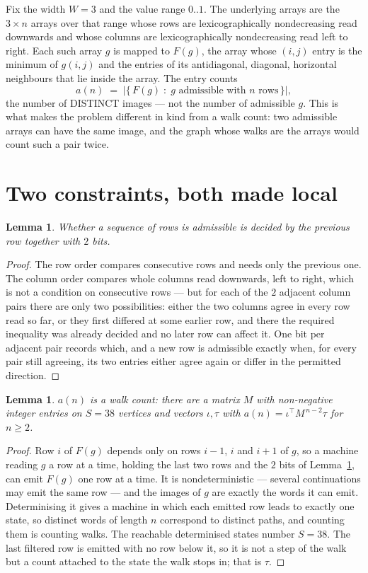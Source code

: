 \documentclass[11pt,a4paper]{article}
\theoremstyle{plain}
\newtheorem{lemma}[theorem]{Lemma}
\theoremstyle{definition}
\begin{document}
Fix the width $W=3$ and the value range $0..1$. The underlying arrays are the
$3\times n$ arrays over that range whose rows are lexicographically nondecreasing read downwards
and whose columns are lexicographically nondecreasing read left to right. Each such array $g$
is mapped to $F(g)$, the array whose $(i,j)$ entry is the minimum of $g(i,j)$ and the entries
of its antidiagonal, diagonal, horizontal neighbours that lie inside the array. The entry counts
\[
a(n)\;=\;\bigl|\{\,F(g)\;:\;g\text{ admissible with }n\text{ rows}\,\}\bigr|,
\]
the number of DISTINCT images --- not the number of admissible $g$. This is what makes the
problem different in kind from a walk count: two admissible arrays can have the same image, and
the graph whose walks are the arrays would count such a pair twice.

\section{Two constraints, both made local}

\begin{lemma}\label{lem:local}
Whether a sequence of rows is admissible is decided by the previous row together with
$2$ bits.
\end{lemma}

\begin{proof}
The row order compares consecutive rows and needs only the previous one. The column order
compares whole columns read downwards, left to right, which is not a condition on consecutive
rows --- but for each of the $2$ adjacent column pairs there are only two possibilities:
either the two columns agree in every row read so far, or they first differed at some earlier
row, and there the required inequality was already decided and no later row can affect it. One
bit per adjacent pair records which, and a new row is admissible exactly when, for every pair
still agreeing, its two entries either agree again or differ in the permitted direction.
\end{proof}

\begin{lemma}\label{lem:det}
$a(n)$ is a walk count: there are a matrix $M$ with non-negative integer entries on $S=38$
vertices and vectors $\iota,\tau$ with $a(n)=\iota^{\!\top}M^{\,n-2}\tau$ for $n\ge2$.
\end{lemma}

\begin{proof}
Row $i$ of $F(g)$ depends only on rows $i-1$, $i$ and $i+1$ of $g$, so a machine reading $g$ a
row at a time, holding the last two rows and the $2$ bits of Lemma~\ref{lem:local}, can
emit $F(g)$ one row at a time. It is nondeterministic --- several continuations may emit the
same row --- and the images of $g$ are exactly the words it can emit. Determinising it gives a
machine in which each emitted row leads to exactly one state, so distinct words of length $n$
correspond to distinct paths, and counting them is counting walks. The reachable determinised
states number $S=38$. The last filtered row is emitted with no row below it, so it is not a
step of the walk but a count attached to the state the walk stops in; that is $\tau$.
\end{proof}
\end{document}
